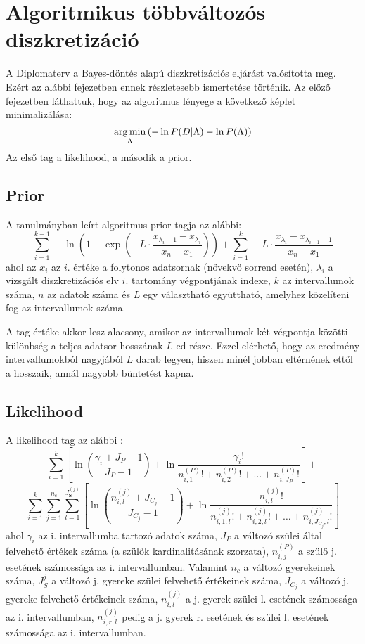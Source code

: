 \chapter{Algoritmikus többváltozós diszkretizáció}
\label{chapter:bayesdontesalapu}
A Diplomaterv a Bayes-döntés alapú diszkretizációs eljárást valósította meg. Ezért az alábbi fejezetben ennek részletesebb ismertetése történik. Az előző fejezetben láthattuk, hogy az algoritmus lényege a következő képlet minimalizálása:
$$ \mathop{\mathrm{arg\,min}}_{\Lambda}{(-\ln{P(D | \Lambda)} - \ln{P(\Lambda)})}$$
Az első tag a likelihood, a második a prior.

\section{Prior}
A tanulmányban \cite{chen2017learning} leírt algoritmus prior tagja az alábbi:
$$\sum_{i=1}^{k-1} -\ln{(1-\exp{(
-L \cdot \frac{x_{\lambda_i+1}-x_{\lambda_i}}{x_{n}-x_{1}})})} +
\sum_{i=1}^{k}
-L \cdot \frac{x_{\lambda_i}-x_{\lambda_{i-1}+1}}{x_{n}-x_{1}}$$
ahol az $x_i$ az $i$. értéke a folytonos adatsornak (növekvő sorrend esetén), $\lambda_i$ a vizsgált diszkretizációs elv $i$. tartomány végpontjának indexe, $k$ az intervallumok száma, $n$ az adatok száma és $L$ egy választható együttható, amelyhez közelíteni fog az intervallumok száma.

A tag értéke akkor lesz alacsony, amikor az intervallumok két végpontja közötti különbség a teljes adatsor hosszának $L$-ed része. Ezzel elérhető, hogy az eredmény intervallumokból nagyjából $L$ darab legyen, hiszen minél jobban eltérnének ettől a hosszaik, annál nagyobb büntetést kapna.

\section{Likelihood}
A likelihood tag az alábbi \cite{boulle2006modl}:
$$
\sum_{i = 1}^{k} \left[ \ln \binom{\gamma_i+J_P-1}{J_P-1} + \ln \frac{\gamma_i!}{n_{i,1}^{(P)}! + n_{i,2}^{(P)}! + \dotsc + n_{i,J_P}^{(P)}!}\right] +
$$
$$
\sum_{i = 1}^{k}\sum_{j=1}^{n_c} \sum_{l=1}^{J_\textbf{S}^{(j)}} \left[ \ln \binom{n_{i,l}^{(j)}+J_{C_j}-1}{J_{C_j}-1} + \ln \frac{n_{i,l}^{(j)}!} {n_{i,1,l}^{(j)}! + n_{i,2,l}^{(j)}! + \dotsc + n_{i,J_{C_j},l}^{(j)}!}  \right]
$$
ahol $\gamma_i$ az i. intervallumba tartozó adatok száma, $J_P$ a változó szülei által felvehető értékek száma (a szülők kardinalitásának szorzata), $n_{i,j}^{(P)}$ a szülő j. esetének számossága az i. intervallumban.
Valamint $n_c$ a változó gyerekeinek száma, $J_S^{j}$ a változó j. gyereke szülei felvehető értékeinek száma, $J_{C_j}$ a változó j. gyereke felvehető értékeinek száma, $n_{i,l}^{(j)}$ a j. gyerek szülei l. esetének számossága az i. intervallumban, $n_{i,r,l}^{(j)}$ pedig a j. gyerek r. esetének és szülei l. esetének számossága az i. intervallumban.

